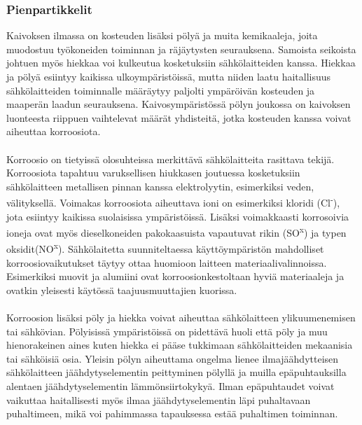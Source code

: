 \documentclass[finnish,12pt,a4paper,pdftex,elec,utf8]{aaltothesis}
\begin{document}
\subsubsection{Pienpartikkelit}
Kaivoksen ilmassa on kosteuden lisäksi pölyä ja muita kemikaaleja, joita muodostuu työkoneiden toiminnan ja räjäytysten seurauksena. Samoista seikoista johtuen myös hiekkaa voi kulkeutua kosketuksiin sähkölaitteiden kanssa. Hiekkaa ja pölyä esiintyy kaikissa ulkoympäristöissä, mutta niiden laatu haitallisuus sähkölaitteiden toiminnalle määräytyy paljolti ympäröivän kosteuden ja maaperän laadun seurauksena. Kaivosympäristössä pölyn joukossa on kaivoksen luonteesta riippuen vaihtelevat määrät yhdisteitä, jotka kosteuden kanssa voivat aiheuttaa korroosiota.
\\\\
Korroosio on tietyissä olosuhteissa merkittävä sähkölaitteita rasittava tekijä. Korroosiota tapahtuu varuksellisen hiukkasen joutuessa kosketuksiin sähkölaitteen metallisen pinnan kanssa elektrolyytin, esimerkiksi veden, välityksellä. Voimakas korroosiota aiheuttava ioni on esimerkiksi kloridi (Cl\textsuperscript{-}), jota esiintyy kaikissa suolaisissa ympäristöissä. Lisäksi voimakkaasti korrosoivia ioneja ovat myös dieselkoneiden pakokaasuista vapautuvat rikin (SO\textsuperscript{x}) ja typen oksidit(NO\textsuperscript{x}). Sähkölaitetta suunniteltaessa käyttöympäristön mahdolliset korroosiovaikutukset täytyy ottaa huomioon laitteen materiaalivalinnoissa. Esimerkiksi muovit ja alumiini ovat korroosionkestoltaan hyviä materiaaleja ja ovatkin yleisesti käytössä taajuusmuuttajien kuorissa.
\\\\
Korroosion lisäksi pöly ja hiekka voivat aiheuttaa sähkölaitteen ylikuumenemisen tai sähkövian. Pölyisissä ympäristöissä on pidettävä huoli että pöly ja muu hienorakeinen aines kuten hiekka ei pääse tukkimaan sähkölaitteiden mekaanisia tai sähköisiä osia. Yleisin pölyn aiheuttama ongelma lienee ilmajäähdytteisen sähkölaitteen jäähdytyselementin peittyminen pölyllä ja muilla epäpuhtauksilla alentaen jäähdytyselementin lämmönsiirtokykyä. Ilman epäpuhtaudet voivat vaikuttaa haitallisesti myös ilmaa jäähdytyselementin läpi puhaltavaan puhaltimeen, mikä voi pahimmassa tapauksessa estää puhaltimen toiminnan.\cite{Pallasmaa}
\end{document}

